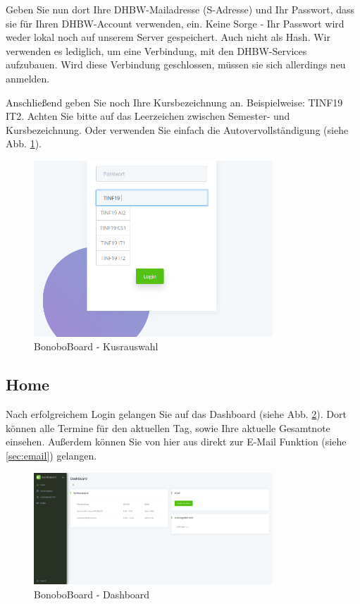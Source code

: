 \documentclass[a4paper,11pt]{scrartcl}
\begin{document}
\noindent Geben Sie nun dort Ihre DHBW-Mailadresse (\frqq{}S-Adresse\flqq{}) und Ihr Passwort, dass sie für Ihren DHBW-Account verwenden, ein. Keine Sorge - Ihr Passwort wird weder lokal noch auf unserem Server gespeichert. Auch nicht als Hash. Wir verwenden es lediglich, um eine Verbindung, mit den DHBW-Services aufzubauen. Wird diese Verbindung geschlossen, müssen sie sich allerdings neu anmelden.

\bigskip
\noindent Anschließend geben Sie noch Ihre Kursbezeichnung an. Beispielweise: \frqq{}TINF19 IT2\flqq{}. Achten Sie bitte auf das Leerzeichen zwischen Semester- und Kursbezeichnung. Oder verwenden Sie einfach die Autovervollständigung (siehe Abb. \ref{img:autocomplete}).
\begin{figure}[H]
	\begin{center}
		\includegraphics[width=0.8\textwidth]{autocomplete}
		\caption{BonoboBoard - Kusrauswahl}
		\label{img:autocomplete}
	\end{center}
\end{figure}
\noindent

\subsection{Home}
Nach erfolgreichem Login gelangen Sie auf das Dashboard (siehe Abb. \ref{img:dashboard}). Dort können alle Termine für den aktuellen Tag, sowie Ihre aktuelle Gesamtnote einsehen. Außerdem können Sie von hier aus direkt zur E-Mail Funktion (siehe \ref{sec:email}) gelangen.

\begin{figure}[H]
	\begin{center}
		\includegraphics[width=0.8\textwidth]{Dashboard}
		\caption{BonoboBoard - Dashboard}
		\label{img:dashboard}
	\end{center}
\end{figure}
\noindent
\end{document}
